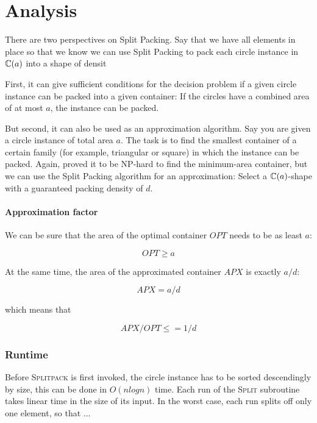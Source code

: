 \documentclass[a4paper,style=print,oneside,bibliography=totoc,nexus,lnum,extramargin]{tubsbook}
\begin{document}
\section{Analysis}

There are two perspectives on Split Packing. Say that we have all elements in place so that we know we can use Split Packing to pack each circle instance in $\mathbb{C}(a)$ into a shape of densit

First, it can give sufficient conditions for the decision problem if a given circle instance can be packed into a given container: If the circles have a combined area of at most $a$, the instance can be packed.

But second, it can also be used as an approximation algorithm. Say you are given a circle instance of total area $a$. The task is to find the smallest container of a certain family (for example, triangular or square) in which the instance can be packed. Again, \textcite{DFL2010circle} proved it to be NP-hard to find the minimum-area container, but we can use the Split Packing algorithm for an approximation: Select a $\mathbb{C}(a)$-shape with a guaranteed packing density of $d$.

\paragraph{Approximation factor}

We can be sure that the area of the optimal container $OPT$ needs to be as least $a$:

$$OPT \ge a$$

At the same time, the area of the approximated container $APX$ is exactly $a/d$:

$$APX = a/d$$

which means that

$$APX/OPT \le = 1/d$$

\subsubsection{Runtime}

Before \textsc{Splitpack} is first invoked, the circle instance has to be sorted descendingly by size, this can be done in $O(n log n)$ time. Each run of the \textsc{Split} subroutine takes linear time in the size of its input. In the worst case, each run splits off only one element, so that ...
\end{document}
